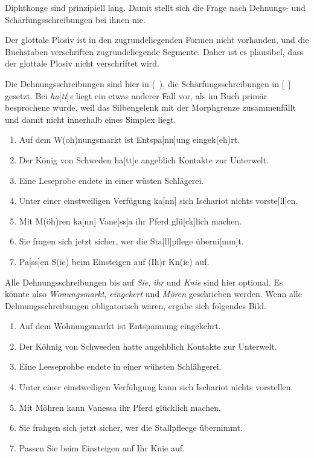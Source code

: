 \label{sol:phonologischeschreibprinzipien02} Diphthonge sind prinzipiell lang.
Damit stellt sich die Frage nach Dehnungs- und Schärfungsschreibungen bei ihnen nie.

\label{sol:phonologischeschreibprinzipien03} Der glottale Plosiv ist in den zugrundeliegenden Formen nicht vorhanden, und die Buchstaben verschriften zugrundeliegende Segmente.
Daher ist es plausibel, dass der glottale Plosiv nicht verschriftet wird.

\label{sol:phonologischeschreibprinzipien04} 

Die Dehnungsschreibungen sind hier in (~), die Schärfungsschreibungen in [~] gesetzt.
Bei \textit{ha}[\textit{tt}]\textit{e} liegt ein etwas anderer Fall vor, als im Buch primär besprochene wurde, weil das Silbengelenk mit der Morphgrenze zusammenfällt und damit nicht innerhalb eines Simplex liegt.

\begin{sloppypar}
\begin{enumerate}
  \item Auf dem W(oh)nungsmarkt ist Entspa[nn]ung eingek(eh)rt.
  \item Der König von Schweden ha[tt]e angeblich Kontakte zur Unterwelt.
  \item Eine Leseprobe endete in einer wüsten Schlägerei.
  \item Unter einer einstweiligen Verfügung ka[nn] sich Ischariot nichts vorste[ll]en.
  \item Mit M(öh)ren ka[nn] Vane[ss]a ihr Pferd glü[ck]lich machen.
  \item Sie fragen sich jetzt sicher, wer die Sta[ll]pflege überni[mm]t.
  \item Pa[ss]en S(ie) beim Einsteigen auf (Ih)r Kn(ie) auf. 
\end{enumerate}
\end{sloppypar}

Alle Dehnungsschreibungen bis auf \textit{Sie}, \textit{ihr} und \textit{Knie} sind hier optional.
Es könnte also \textit{Wonungsmarkt}, \textit{eingekert} und \textit{Mören} geschrieben werden.
Wenn alle Dehnungsschreibungen obligatorisch wären, ergäbe sich \zB folgendes Bild.

\begin{enumerate}
  \item Auf dem Wohnungsmarkt ist Entspannung eingekehrt.
  \item Der Köhnig von Schweeden hatte angehblich Kontakte zur Unterwelt.
  \item Eine Leeseprohbe endete in einer wühsten Schlähgerei.
  \item Unter einer einstweiligen Verfühgung kann sich Ischariot nichts vorstellen.
  \item Mit Möhren kann Vanessa ihr Pferd glücklich machen.
  \item Sie frahgen sich jetzt sicher, wer die Stallpfleege übernimmt.
  \item Passen Sie beim Einsteigen auf Ihr Knie auf. 
\end{enumerate}

